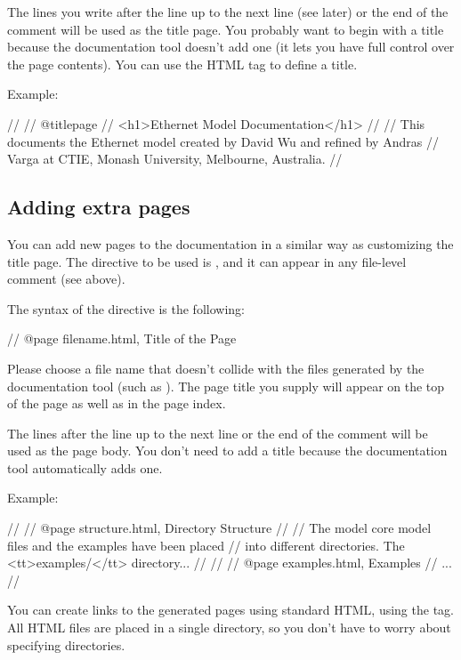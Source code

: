The lines you write after the  line up to the next
 line (see later) or the end of the comment will be used
as the title page.
You probably want to begin with a title because the documentation
tool doesn't add one (it lets you have full control over the
page contents). You can use the  HTML tag
to define a title.

Example:

\begin{ned}
//
// @titlepage
// <h1>Ethernet Model Documentation</h1>
//
// This documents the Ethernet model created by David Wu and refined by Andras
// Varga at CTIE, Monash University, Melbourne, Australia.
//
\end{ned}


\subsection{Adding extra pages}

You can add new pages to the documentation in a similar way as customizing
the title page. The directive to be used is , and it can
appear in any file-level comment (see above).

The syntax of the  directive is the following:

\begin{ned}
// @page filename.html, Title of the Page
\end{ned}

Please choose a file name that doesn't collide with the files generated
by the documentation tool (such as ).
The page title you supply will appear on the top of the page as well as
in the page index.

The lines after the  line up to the next  line
or the end of the comment will be used as the page body.
You don't need to add a title because the documentation tool
automatically adds one.

Example:
\begin{ned}
//
// @page structure.html, Directory Structure
//
// The model core model files and the examples have been placed
// into different directories. The <tt>examples/</tt> directory...
//
//
// @page examples.html, Examples
// ...
//
\end{ned}

You can create links to the generated pages using standard HTML,
using the  tag. All HTML files are
placed in a single directory, so you don't have to worry about
specifying directories.

